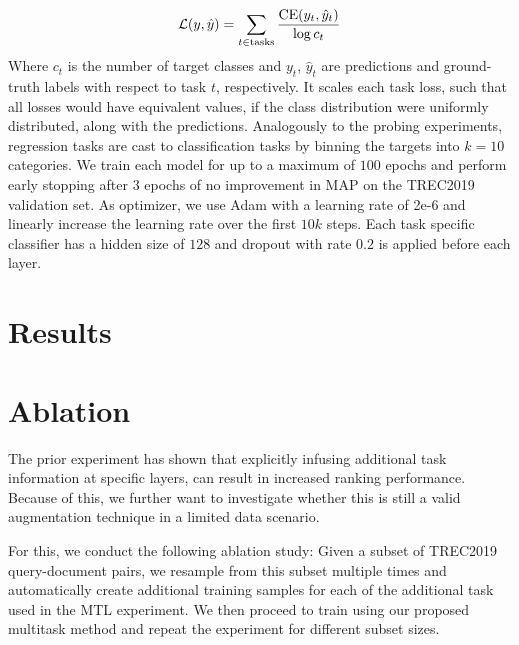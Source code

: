 \begin{equation}
    \mathcal{L}(y, \hat{y}) = \sum_{t \in \text{tasks}} \frac{\textnormal{CE}(y_t, \hat{y}_t)}{\log c_t}
\end{equation}
Where $c_t$ is the number of target classes and $y_t$, $\hat{y}_t$ are predictions and ground-truth labels with respect to task $t$, respectively. It scales each task loss, such that all losses would have equivalent values, if the class distribution were uniformly distributed, along with the predictions. Analogously to the probing experiments, regression tasks are cast to classification tasks by binning the targets into $k=10$ categories.
We train each model for up to a maximum of $100$ epochs and perform early stopping after $3$ epochs of no improvement in MAP on the TREC2019 validation set. As optimizer, we use Adam\cite{kingma2014adam} with a learning rate of 2e-6 and linearly increase the learning rate over the first $10k$ steps. Each task specific classifier has a hidden size of $128$ and dropout with rate $0.2$ is applied before each layer.

\section{Results}
\section{Ablation}
The prior experiment has shown that explicitly infusing additional task information at specific layers, can result in increased ranking performance. Because of this, we further want to investigate whether this is still a valid augmentation technique in a limited data scenario.

For this, we conduct the following ablation study: Given a subset of TREC2019 query-document pairs, we resample from this subset multiple times and automatically create additional training samples for each of the additional task used in the MTL experiment. We then proceed to train using our proposed multitask method and repeat the experiment for different subset sizes.